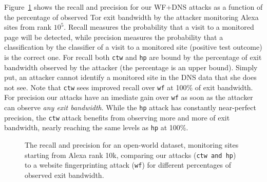 Figure~\ref{fig:wfdns:torpct} shows the recall and precision for our WF+DNS
attacks as a function of the percentage of observed Tor exit bandwidth by the
attacker monitoring Alexa sites from rank $10^5$.
Recall measures the probability that a visit to a monitored page will
be detected, while precision measures the probability that a classification by
the classifier of a visit to a monitored site (positive test outcome) is the
correct one. %
For recall both \texttt{ctw} and \texttt{hp} are bound by the
percentage of exit bandwidth observed by the attacker (the percentage is an
upper bound).
Simply put, an attacker cannot identify a monitored site in the DNS data that
she does not see. Note that \texttt{ctw} sees improved recall over \texttt{wf}
at 100\% of exit bandwidth.
For precision our attacks have an imediate gain over \texttt{wf} as soon as
the attacker can observe \emph{any exit bandwidth}.
While the \texttt{hp} attack has constantly near-perfect precision, the
\texttt{ctw} attack benefits from observing more and more of exit bandwidth,
nearly reaching the same levels as \texttt{hp} at 100\%.


\begin{figure}[t]
\centering
{}
\caption{The recall and precision for an open-world dataset, monitoring sites
starting from Alexa rank 10k, comparing our attacks (\texttt{ctw and
 \texttt{hp}}) to a website fingerprinting attack (\texttt{wf}) for different
 percentages of observed exit bandwidth. }
\label{fig:wfdns:torpct}
\end{figure}



